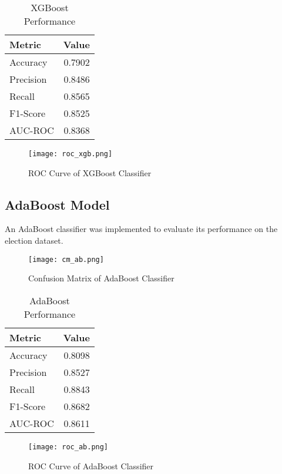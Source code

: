 \documentclass[12pt]{article}
\begin{document}
\begin{table}[H]
\centering
\caption{XGBoost Performance}
\label{tab:xgb_perf}
\begin{tabular}{lr}
\toprule
\textbf{Metric} & \textbf{Value} \\
\midrule
Accuracy & 0.7902 \\
Precision & 0.8486 \\
Recall & 0.8565 \\
F1-Score & 0.8525 \\
AUC-ROC & 0.8368 \\
\bottomrule
\end{tabular}
\end{table}

\begin{figure}[H]
    \centering
    \texttt{[image: roc\_xgb.png]}
    \caption{ROC Curve of XGBoost Classifier}
    \label{fig:example}
\end{figure}


\subsection{AdaBoost Model}
An AdaBoost classifier was implemented to evaluate its performance on the election dataset.


\begin{figure}[H]
    \centering
    \texttt{[image: cm\_ab.png]}
    \caption{Confusion Matrix of AdaBoost Classifier}
    \label{fig:example}
\end{figure}

\begin{table}[H]
\centering
\caption{AdaBoost Performance}
\label{tab:ada_perf}
\begin{tabular}{lr}
\toprule
\textbf{Metric} & \textbf{Value} \\
\midrule
Accuracy & 0.8098 \\
Precision & 0.8527 \\
Recall & 0.8843 \\
F1-Score & 0.8682 \\
AUC-ROC & 0.8611 \\
\bottomrule
\end{tabular}
\end{table}

\begin{figure}[H]
    \centering
    \texttt{[image: roc\_ab.png]}
    \caption{ROC Curve of AdaBoost Classifier}
    \label{fig:example}
\end{figure}
\end{document}
